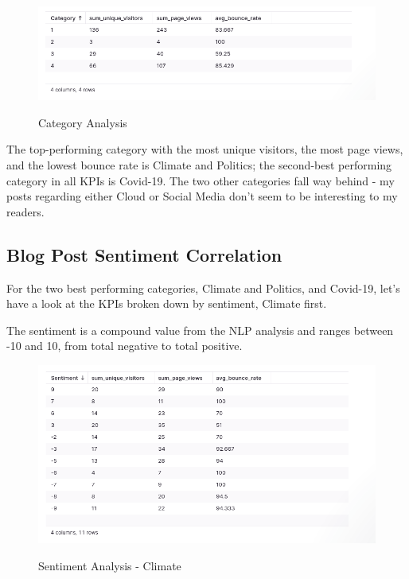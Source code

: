 \begin{figure}[H]
\centering
\caption {Category Analysis}
\includegraphics[width=\linewidth]{images/analysis-category.png}
\label{fig:analysisCategory}
\end{figure}

The top-performing category with the most unique visitors, the most page views, and the lowest bounce rate is Climate and Politics; the second-best performing category in all KPIs is Covid-19. The two other categories fall way behind - my posts regarding either Cloud or Social Media don't seem to be interesting to my readers.

\subsection{Blog Post Sentiment Correlation}

For the two best performing categories, Climate and Politics, and Covid-19, let's have a look at the KPIs broken down by sentiment, Climate first.

The sentiment is a compound value from the NLP analysis and ranges between -10 and 10, from total negative to total positive.

\begin{figure}[H]
\centering
\caption {Sentiment Analysis - Climate}
\includegraphics[width=\linewidth]{images/analysis-sentiment-climate.png}
\label{fig:sentimentClimate}
\end{figure}

